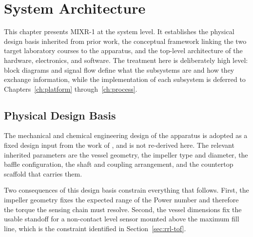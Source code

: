 
\chapter{System Architecture}
\label{ch:system}

\ifpdf
    \graphicspath{{Chapter3/Figs/Raster/}{Chapter3/Figs/PDF/}{Chapter3/Figs/}}
\else
    \graphicspath{{Chapter3/Figs/Vector/}{Chapter3/Figs/}}
\fi

This chapter presents MIXR-1 at the system level. It establishes the physical design basis inherited from prior work, the conceptual framework linking the two target laboratory courses to the apparatus, and the top-level architecture of the hardware, electronics, and software. The treatment here is deliberately high level: block diagrams and signal flow define what the subsystems are and how they exchange information, while the implementation of each subsystem is deferred to Chapters~\ref{ch:platform} through~\ref{ch:process}.


\section{Physical Design Basis}
\label{sec:arch-basis}

The mechanical and chemical engineering design of the apparatus is adopted as a fixed design input from the work of \citet{dumalagan2024}, and is not re-derived here. The relevant inherited parameters are the vessel geometry, the impeller type and diameter, the baffle configuration, the shaft and coupling arrangement, and the countertop scaffold that carries them.


Two consequences of this design basis constrain everything that follows. First, the impeller geometry fixes the expected range of the Power number and therefore the torque the sensing chain must resolve. Second, the vessel dimensions fix the usable standoff for a non-contact level sensor mounted above the maximum fill line, which is the constraint identified in Section~\ref{sec:rrl-tof}.



